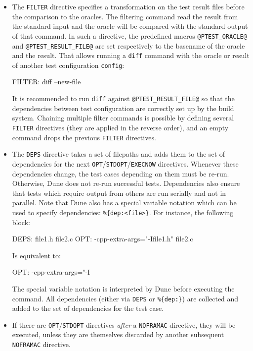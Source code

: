 \begin{itemize}
  the directory containing the current test suite are actually part of
  the suite. This directive is only
  usable in a \texttt{test\_config}
  configuration file.
\item The \texttt{FILTER} directive specifies
  a transformation on the test result files before the comparison to the oracles.
  The filtering command read the result from the standard input and the oracle
  will be compared with the standard output of that command.
  In such a directive, the predefined macros \texttt{@PTEST\_ORACLE@} and
  \texttt{@PTEST\_RESULT\_FILE@} are set respectively to the basename of the
  oracle and the result.
  That allows running a \texttt{diff} command with the oracle or result of
  another test configuration \texttt{config}:
  \begin{code}
FILTER: diff --new-file %
  \end{code}
  It is recommended to run \texttt{diff} against \texttt{@PTEST\_RESULT\_FILE@}
  so that the dependencies between test configuration are correctly set up by
  the build system.
  Chaining multiple filter commands is possible by defining several \texttt{FILTER} directives (they are applied in the reverse order),
  and an empty command drops the previous \texttt{FILTER} directives.
\item The \texttt{DEPS} directive takes a set
  of filepaths and adds them to the set of dependencies for the next
  \texttt{OPT}/\texttt{STDOPT}/\texttt{EXECNOW} directives.
  Whenever these dependencies change, the test
  cases depending on them must be re-run. Otherwise, Dune does not re-run
  successful tests. Dependencies also ensure that tests which require output
  from others are run serially and not in parallel.
  Note that Dune also has a special variable notation which can be used to
  specify dependencies: \verb|%{dep:<file>}|. For instance, the following
    block:
    \begin{code}
      DEPS: file1.h file2.c
      OPT: -cpp-extra-args="-Ifile1.h" file2.c
    \end{code}
    Is equivalent to:
    \begin{code}
      OPT: -cpp-extra-args="-I%
    \end{code}
    The special variable notation is interpreted by Dune before executing the
    command. All dependencies (either via \texttt{DEPS} or \verb|%{dep:}|) are
    collected and added to the set of dependencies for the test case.
\item
  If there are \texttt{OPT}/\texttt{STDOPT} directives \textit{after} a
  \texttt{NOFRAMAC} directive, they will be executed, unless
  they are themselves discarded by another subsequent \texttt{NOFRAMAC}
  directive.
\end{itemize}


